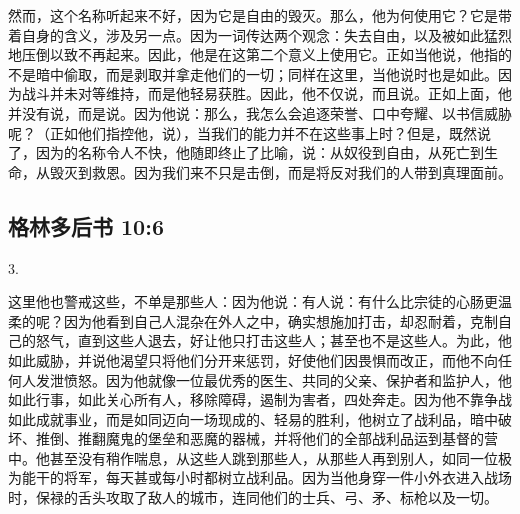 然而，这个名称听起来不好，因为它是自由的毁灭。那么，他为何使用它？它是带着自身的含义，涉及另一点。因为一词传达两个观念：失去自由，以及被如此猛烈地压倒以致不再起来。因此，他是在这第二个意义上使用它。正如当他说，他指的不是暗中偷取，而是剥取并拿走他们的一切；同样在这里，当他说时也是如此。因为战斗并未对等维持，而是他轻易获胜。因此，他不仅说，而且说。正如上面，他并没有说，而是说。因为他说：那么，我怎么会追逐荣誉、口中夸耀、以书信威胁呢？（正如他们指控他，说），当我们的能力并不在这些事上时？但是，既然说了，因为的名称令人不快，他随即终止了比喻，说：从奴役到自由，从死亡到生命，从毁灭到救恩。因为我们来不只是击倒，而是将反对我们的人带到真理面前。\par


\subsection{格林多后书 10:6}

3. \par

这里他也警戒这些，不单是那些人：因为他说：有人说：有什么比宗徒的心肠更温柔的呢？因为他看到自己人混杂在外人之中，确实想施加打击，却忍耐着，克制自己的怒气，直到这些人退去，好让他只打击这些人；甚至也不是这些人。为此，他如此威胁，并说他渴望只将他们分开来惩罚，好使他们因畏惧而改正，而他不向任何人发泄愤怒。因为他就像一位最优秀的医生、共同的父亲、保护者和监护人，他如此行事，如此关心所有人，移除障碍，遏制为害者，四处奔走。因为他不靠争战如此成就事业，而是如同迈向一场现成的、轻易的胜利，他树立了战利品，暗中破坏、推倒、推翻魔鬼的堡垒和恶魔的器械，并将他们的全部战利品运到基督的营中。他甚至没有稍作喘息，从这些人跳到那些人，从那些人再到别人，如同一位极为能干的将军，每天甚或每小时都树立战利品。因为当他身穿一件小外衣进入战场时，保禄的舌头攻取了敌人的城市，连同他们的士兵、弓、矛、标枪以及一切。\par

